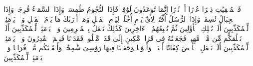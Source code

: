 \stopbuffer%
\startbuffer[\q:77:5]
فَٱلۡمُلۡقِیَٰتِ ذِكۡرًا%
\stopbuffer%
\startbuffer[\q:77:6]
عُذۡرًا أَوۡ نُذۡرًا%
\stopbuffer%
\startbuffer[\q:77:7]
إِنَّمَا تُوعَدُونَ لَوَٰقِعࣱ%
\stopbuffer%
\startbuffer[\q:77:8]
فَإِذَا ٱلنُّجُومُ طُمِسَتۡ%
\stopbuffer%
\startbuffer[\q:77:9]
وَإِذَا ٱلسَّمَاۤءُ فُرِجَتۡ%
\stopbuffer%
\startbuffer[\q:77:10]
وَإِذَا ٱلۡجِبَالُ نُسِفَتۡ%
\stopbuffer%
\startbuffer[\q:77:11]
وَإِذَا ٱلرُّسُلُ أُقِّتَتۡ%
\stopbuffer%
\startbuffer[\q:77:12]
لِأَیِّ یَوۡمٍ أُجِّلَتۡ%
\stopbuffer%
\startbuffer[\q:77:13]
لِیَوۡمِ ٱلۡفَصۡلِ%
\stopbuffer%
\startbuffer[\q:77:14]
وَمَاۤ أَدۡرَىٰكَ مَا یَوۡمُ ٱلۡفَصۡلِ%
\stopbuffer%
\startbuffer[\q:77:15]
وَیۡلࣱ یَوۡمَئِذࣲ لِّلۡمُكَذِّبِینَ%
\stopbuffer%
\startbuffer[\q:77:16]
أَلَمۡ نُهۡلِكِ ٱلۡأَوَّلِینَ%
\stopbuffer%
\startbuffer[\q:77:17]
ثُمَّ نُتۡبِعُهُمُ ٱلۡءَاخِرِینَ%
\stopbuffer%
\startbuffer[\q:77:18]
كَذَٰلِكَ نَفۡعَلُ بِٱلۡمُجۡرِمِینَ%
\stopbuffer%
\startbuffer[\q:77:19]
وَیۡلࣱ یَوۡمَئِذࣲ لِّلۡمُكَذِّبِینَ%
\stopbuffer%
\startbuffer[\q:77:20]
أَلَمۡ نَخۡلُقكُّم مِّن مَّاۤءࣲ مَّهِینࣲ%
\stopbuffer%
\startbuffer[\q:77:21]
فَجَعَلۡنَٰهُ فِی قَرَارࣲ مَّكِینٍ%
\stopbuffer%
\startbuffer[\q:77:22]
إِلَىٰ قَدَرࣲ مَّعۡلُومࣲ%
\stopbuffer%
\startbuffer[\q:77:23]
فَقَدَرۡنَا فَنِعۡمَ ٱلۡقَٰدِرُونَ%
\stopbuffer%
\startbuffer[\q:77:24]
وَیۡلࣱ یَوۡمَئِذࣲ لِّلۡمُكَذِّبِینَ%
\stopbuffer%
\startbuffer[\q:77:25]
أَلَمۡ نَجۡعَلِ ٱلۡأَرۡضَ كِفَاتًا%
\stopbuffer%
\startbuffer[\q:77:26]
أَحۡیَاۤءࣰ وَأَمۡوَٰتࣰا%
\stopbuffer%
\startbuffer[\q:77:27]
وَجَعَلۡنَا فِیهَا رَوَٰسِیَ شَٰمِخَٰتࣲ وَأَسۡقَیۡنَٰكُم مَّاۤءࣰ فُرَاتࣰا%
\stopbuffer%
\startbuffer[\q:77:28]
وَیۡلࣱ یَوۡمَئِذࣲ لِّلۡمُكَذِّبِینَ%
\stopbuffer%
